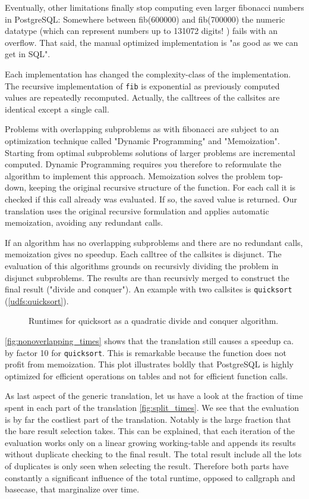 Eventually, other limitations finally stop computing even larger fibonacci numbers in PostgreSQL: Somewhere between fib(600000) and fib(700000) the numeric datatype (which can represent numbers up to 131072 digits! \cite[p. 124 f.]{psql}) fails with an overflow. That said, the manual optimized implementation is "as good as we can get in SQL".

Each implementation has changed the complexity-class of the implementation. The recursive implementation of \texttt{fib} is exponential \cite{} as previously computed values are repeatedly recomputed. Actually, the calltrees of the callsites are identical except a single call.

Problems with overlapping subproblems as with fibonacci are subject to an optimization technique called "Dynamic Programming" and "Memoization". Starting from optimal subproblems solutions of larger problems are incremental computed. Dynamic Programming requires you therefore to reformulate the algorithm to implement this approach. Memoization solves the problem top-down, keeping the original recursive structure of the function. For each call it is checked if this call already was evaluated. If so, the saved value is returned. Our translation uses the original recursive formulation and applies automatic memoization, avoiding any redundant calls.

If an algorithm has no overlapping subproblems and there are no redundant calls, memoization gives no speedup. Each calltree of the callsites is disjunct. The evaluation of this algorithms grounds on recursivly dividing the problem in disjunct subproblems. The results are than recursivly merged to construct the final result ("divide and conquer"). An example with two callsites is \texttt{quicksort} (\autoref{udfs:quicksort}).

\begin{figure}[h!]
    \centering\small
    
    \caption{Runtimes for quicksort as a quadratic divide and conquer algorithm.}
    \label{fig:nonoverlapping_times}
\end{figure}

\autoref{fig:nonoverlapping_times} shows that the translation still causes a speedup ca. by factor 10 for \texttt{quicksort}. This is remarkable because the function does not profit from memoization. This plot illustrates boldly that PostgreSQL is highly optimized for efficient operations on tables and not for efficient function calls.

As last aspect of the generic translation, let us have a look at the fraction of time spent in each part of the translation \autoref{fig:split_times}. We see that the evaluation is by far the costliest part of the translation. Notably is the large fraction that the bare result selection takes. This can be explained, that each iteration of the evaluation works only on a linear growing working-table and appends its results without duplicate checking to the final result. The total result include all the lots of duplicates is only seen when selecting the result. Therefore both parts have constantly a significant influence of the total runtime, opposed to callgraph and basecase, that marginalize over time.

